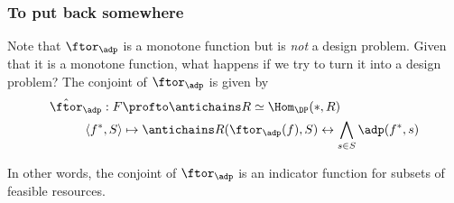 \subsubsection{To put back somewhere}
Note that $\ftor_\adp$ is a monotone function but is \emph{not} a design problem.
Given that it is a monotone function, what happens if we try to turn it into a design problem?
The conjoint of $\ftor_\adp$ is given by
\begin{equation*}
	\begin{aligned}
		\hat \ftor_\adp : F    & \profto \antichains R \simeq \Hom_\DP(\ast, R)                                          \\
		\langle f^*, S \rangle & \mapsto \antichains R(\ftor_\adp(f), S) \leftrightarrow \bigwedge_{s\in S} \adp(f^*, s)
	\end{aligned}
\end{equation*}

In other words, the conjoint of $\ftor_\adp$ is an indicator function for subsets of feasible resources.

